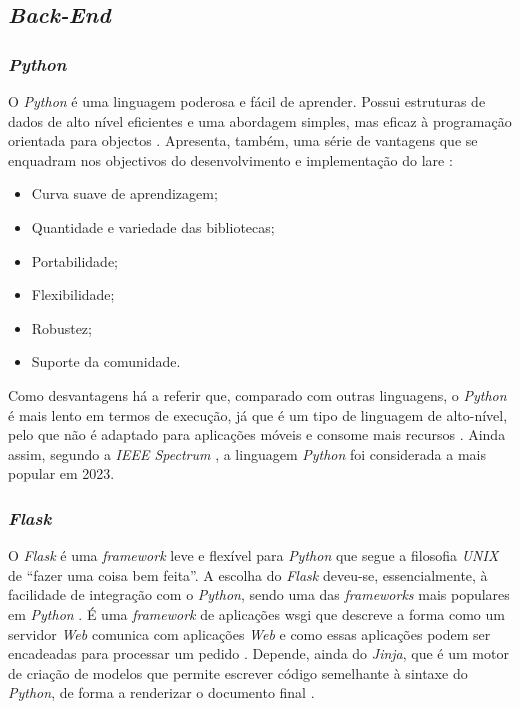 \subsection{\textit{Back-End}}
\label{sec:back-end}
\subsubsection{\textit{Python}}
O \textit{Python} é uma linguagem poderosa e fácil de aprender. Possui estruturas de dados de alto nível eficientes e uma abordagem simples, mas eficaz à programação orientada para objectos \cite{ThePython}. Apresenta, também, uma série de vantagens que se enquadram nos objectivos do desenvolvimento e implementação do \acrshort{lare} \cite{pythonvantagens}:
\begin{itemize}
    \item Curva suave de aprendizagem;
    \item Quantidade e variedade das bibliotecas;
    \item Portabilidade;
    \item Flexibilidade;
    \item Robustez;
    \item Suporte da comunidade.
\end{itemize}

Como desvantagens há a referir que, comparado com outras linguagens, o \textit{Python} é mais lento em termos de execução, já que é um tipo de linguagem de alto-nível, pelo que não é adaptado para aplicações móveis e consome mais recursos \cite{pythonvantagens} \cite{5MainDispython}. Ainda assim, segundo a \textit{IEEE Spectrum} \cite{ieeespectrum}, a linguagem \textit{Python} foi considerada a mais popular em 2023.

\subsubsection{\textit{Flask}}
O \textit{Flask} é uma \textit{framework} leve e flexível para \textit{Python} que segue a filosofia \textit{UNIX} de ``fazer uma coisa bem feita''. A escolha do \textit{Flask} deveu-se, essencialmente, à facilidade de integração com o \textit{Python}, sendo uma das \textit{frameworks} mais populares em \textit{Python} \cite{Flask}. É uma \textit{framework} de aplicações \acrfull{wsgi} que descreve a forma como um servidor \textit{Web} comunica com aplicações \textit{Web} e como essas aplicações podem ser encadeadas para processar um pedido \cite{wsgi}. Depende, ainda do  \textit{Jinja}, que é um motor de criação de modelos que permite escrever código semelhante à sintaxe do \textit{Python}, de forma a renderizar o documento final \cite{Jinja}.

